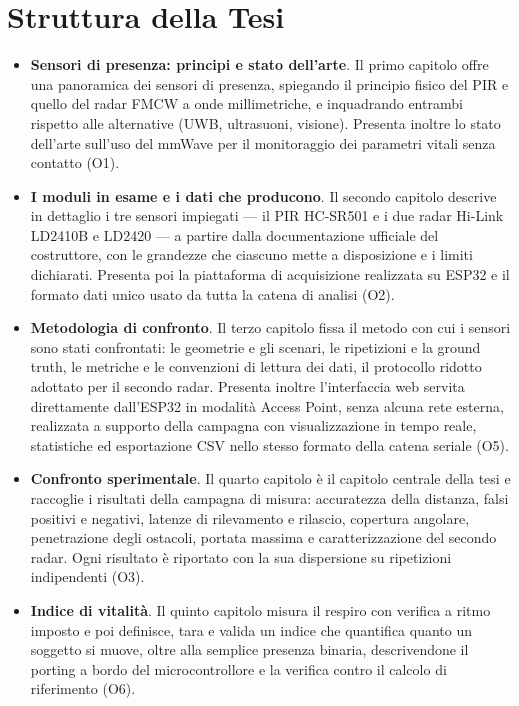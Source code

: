 \section{Struttura della Tesi}
\label{sec:struttura}

\begin{itemize}[leftmargin=1.4em,itemsep=4pt]
  \item \textbf{Sensori di presenza: principi e stato dell'arte}. Il primo capitolo
    offre una panoramica dei sensori di presenza, spiegando il principio fisico del
    PIR e quello del radar FMCW a onde millimetriche, e inquadrando entrambi rispetto
    alle alternative (UWB, ultrasuoni, visione). Presenta inoltre lo stato dell'arte
    sull'uso del mmWave per il monitoraggio dei parametri vitali senza contatto (O1).

  \item \textbf{I moduli in esame e i dati che producono}. Il secondo capitolo
    descrive in dettaglio i tre sensori impiegati --- il PIR HC-SR501 e i due radar
    Hi-Link LD2410B e LD2420 --- a partire dalla documentazione ufficiale del
    costruttore, con le grandezze che ciascuno mette a disposizione e i limiti
    dichiarati. Presenta poi la piattaforma di acquisizione realizzata su ESP32 e il
    formato dati unico usato da tutta la catena di analisi (O2).

  \item \textbf{Metodologia di confronto}. Il terzo capitolo fissa il metodo con cui i
    sensori sono stati confrontati: le geometrie e gli scenari, le ripetizioni e la
    ground truth, le metriche e le convenzioni di lettura dei dati, il protocollo
    ridotto adottato per il secondo radar. Presenta inoltre l'interfaccia web servita
    direttamente dall'ESP32 in modalità Access Point, senza alcuna rete esterna,
    realizzata a supporto della campagna con visualizzazione in tempo reale,
    statistiche ed esportazione CSV nello stesso formato della catena seriale (O5).

  \item \textbf{Confronto sperimentale}. Il quarto capitolo è il capitolo centrale
    della tesi e raccoglie i risultati della campagna di misura: accuratezza della
    distanza, falsi positivi e negativi, latenze di rilevamento e rilascio, copertura
    angolare, penetrazione degli ostacoli, portata massima e caratterizzazione del
    secondo radar. Ogni risultato è riportato con la sua dispersione su ripetizioni
    indipendenti (O3).

  \item \textbf{Indice di vitalità}. Il quinto capitolo misura il respiro con verifica
    a ritmo imposto e poi definisce, tara e valida un indice che quantifica quanto un
    soggetto si muove, oltre alla semplice presenza binaria, descrivendone il porting
    a bordo del microcontrollore e la verifica contro il calcolo di riferimento (O6).


\end{itemize}
